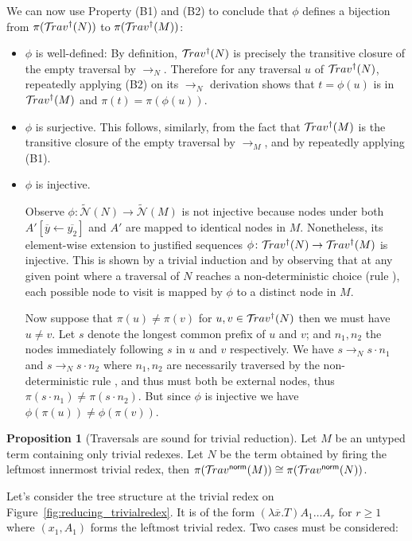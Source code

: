 \documentclass{article}
\theoremstyle{definition}
\newtheorem{proposition}{Proposition}[section]
\newcommand\Nodes{\mathcal{N}}%
\newcommand\ExtendedNodes{\tilde{\Nodes}}
\newcommand{\normalizing}{{\sf norm}}
\newcommand{\travsetnorm}{\travset^\normalizing}
\def\coresymbol{\pi} %
\begin{document}
We can now use Property (B1) and (B2) to conclude that $\phi$ defines a bijection from $\coresymbol(\travset^\dagger(N))$ to $\coresymbol(\travset^\dagger(M))$:
\begin{itemize}
    \item $\phi$ is well-defined: By definition, $\mathcal{T}\!rav^\dagger(N)$ is precisely the transitive closure of the empty traversal by $\rightarrow_N$. Therefore for any traversal $u$ of $\mathcal{T}\!rav^\dagger(N)$, repeatedly applying (B2) on its $\rightarrow_N$ derivation shows that $t=\phi(u)$ is in $\mathcal{T}\!rav^\dagger(M)$ and $\coresymbol(t)=\coresymbol(\phi(u))$.

    \item $\phi$ is surjective. This follows, similarly, from the fact that $\mathcal{T}\!rav^\dagger(M)$ is the transitive closure of the empty traversal by $\rightarrow_M$, and by repeatedly applying (B1).

    \item $\phi$ is injective.

    Observe $\phi\colon\ExtendedNodes(N)\rightarrow\ExtendedNodes(M)$ is not injective because nodes under both $A'[\overline{y}\leftarrow\overline{y_2}]$ and $A'$ are mapped to identical nodes in $M$. Nonetheless, its element-wise extension to justified sequences $\phi\colon\mathcal{T}\!rav^\dagger(N)\rightarrow\mathcal{T}\!rav^\dagger(M)$ is injective. This is shown by a trivial induction and by observing that at any given point where a traversal of $N$ reaches a non-deterministic choice (rule ), each possible node to visit is mapped by $\phi$ to a distinct node in $M$.

    Now suppose that $\coresymbol(u)\neq\coresymbol(v)$ for $u,v\in\mathcal{T}\!rav^\dagger(N)$ then we must have $u\neq v$.
    Let $s$ denote the longest common prefix of $u$ and $v$; and $n_1, n_2$ the nodes immediately following $s$ in $u$ and $v$ respectively. We have $s \rightarrow_N s \cdot n_1$ and $s \rightarrow_N s\cdot n_2$ where $n_1, n_2$ are necessarily traversed by the non-deterministic rule , and thus must both be external nodes, thus $\coresymbol(s\cdot n_1)\neq \coresymbol(s\cdot n_2)$. But since $\phi$ is injective we have $\phi(\coresymbol(u))\ne \phi(\coresymbol(v))$.
\end{itemize}
\endproofatend

\begin{proposition}[Traversals are sound for trivial reduction]
\label{prop:ulctrav_sound_for_trivialreduction}
    Let $M$ be an untyped term containing only trivial redexes.
    Let $N$ be the term obtained by firing the leftmost innermost trivial redex, then $\coresymbol(\travsetnorm(M)) \cong \coresymbol(\travsetnorm(N))$.
\end{proposition}
\proofatend
Let's consider the tree structure at the trivial redex on Figure~\ref{fig:reducing_trivialredex}. It is of the form $(\lambda \overline{x} . T) A_1 \ldots A_r$ for $r\geq1$ where $(x_1, A_1)$ forms the leftmost trivial redex.
    Two cases must be considered:
\end{document}
